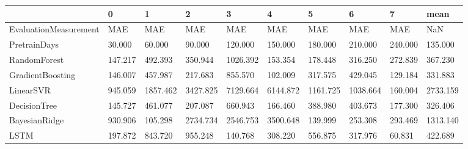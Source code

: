\begin{tabular}{llllllllll}
\toprule
{} &       0 &        1 &        2 &        3 &        4 &        5 &        6 &       7 &     mean \\
\midrule
EvaluationMeasurement &     MAE &      MAE &      MAE &      MAE &      MAE &      MAE &      MAE &     MAE &      NaN \\
PretrainDays          &  30.000 &   60.000 &   90.000 &  120.000 &  150.000 &  180.000 &  210.000 & 240.000 &  135.000 \\
RandomForest          & 147.217 &  492.393 &  350.944 & 1026.392 &  153.354 &  178.448 &  316.250 & 272.839 &  367.230 \\
GradientBoosting      & 146.007 &  457.987 &  217.683 &  855.570 &  102.009 &  317.575 &  429.045 & 129.184 &  331.883 \\
LinearSVR             & 945.059 & 1857.462 & 3427.825 & 7129.664 & 6144.872 & 1161.725 & 1038.664 & 160.004 & 2733.159 \\
DecisionTree          & 145.727 &  461.077 &  207.087 &  660.943 &  166.460 &  388.980 &  403.673 & 177.300 &  326.406 \\
BayesianRidge         & 930.906 &  105.298 & 2734.734 & 2546.753 & 3500.648 &  139.999 &  253.308 & 293.469 & 1313.140 \\
LSTM                  & 197.872 &  843.720 &  955.248 &  140.768 &  308.220 &  556.875 &  317.976 &  60.831 &  422.689 \\
\bottomrule
\end{tabular}
